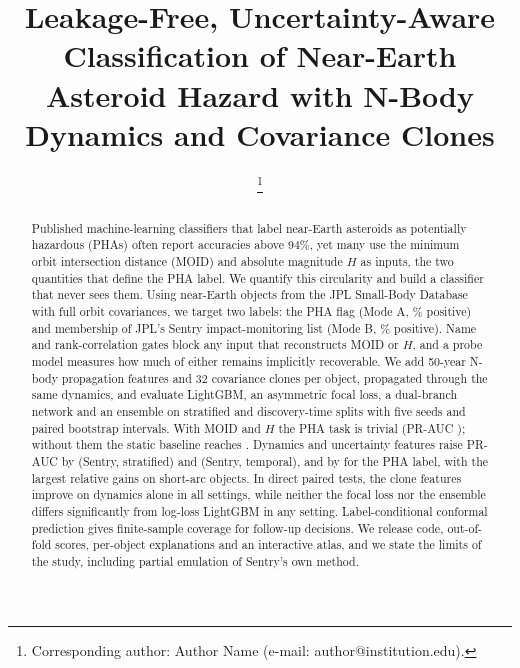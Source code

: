 \documentclass[journal]{IEEEtran}
\begin{document}
\title{Leakage-Free, Uncertainty-Aware Classification of Near-Earth Asteroid Hazard with N-Body Dynamics and Covariance Clones}

\author{
\thanks{Corresponding author: Author Name (e-mail: author@institution.edu).}}

\maketitle

\begin{abstract}
Published machine-learning classifiers that label near-Earth asteroids as potentially hazardous (PHAs) often report accuracies above 94\%, yet many use the minimum orbit intersection distance (MOID) and absolute magnitude $H$ as inputs, the two quantities that define the PHA label. We quantify this circularity and build a classifier that never sees them. Using \NObj{} near-Earth objects from the JPL Small-Body Database with full orbit covariances, we target two labels: the PHA flag (Mode A, \PrevPHA\% positive) and membership of JPL's Sentry impact-monitoring list (Mode B, \PrevSentry\% positive). Name and rank-correlation gates block any input that reconstructs MOID or $H$, and a probe model measures how much of either remains implicitly recoverable. We add 50-year N-body propagation features and 32 covariance clones per object, propagated through the same dynamics, and evaluate LightGBM, an asymmetric focal loss, a dual-branch network and an ensemble on stratified and discovery-time splits with five seeds and paired bootstrap intervals. With MOID and $H$ the PHA task is trivial (PR-AUC \PRPhaStratifiedAllNaive); without them the static baseline reaches \PRPhaStratifiedAllStatic. Dynamics and uncertainty features raise PR-AUC by \DSentryStratifiedAllFull{} (Sentry, stratified) and \DSentryTemporalAllFull{} (Sentry, temporal), and by \DPhaStratifiedAllFull{} for the PHA label, with the largest relative gains on short-arc objects. In direct paired tests, the clone features improve on dynamics alone in all \NSigUncOverDyn{} settings, while neither the focal loss nor the ensemble differs significantly from log-loss LightGBM in any setting. Label-conditional conformal prediction gives finite-sample coverage for follow-up decisions. We release code, out-of-fold scores, per-object explanations and an interactive atlas, and we state the limits of the study, including partial emulation of Sentry's own method.
\end{abstract}
\end{document}
